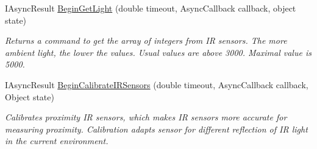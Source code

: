 \begin{DoxyCompactItemize}
  \item   IAsyncResult \hyperlink{class_elib_1_1_epuck_afa1833fd4dfb949fec35efa8ec774cf9}{BeginGetLight} (double timeout, AsyncCallback callback, object state)
  \begin{DoxyCompactList}\small\item\em Returns a command to get the array of integers from IR sensors. The more ambient light, the lower the values. Usual values are above 3000. Maximal value is 5000. \item\end{DoxyCompactList}

  \item IAsyncResult \hyperlink{class_elib_1_1_epuck_a760541d00f318ee59be9fb1c83a0f8cd}{BeginCalibrateIRSensors} (double timeout, AsyncCallback callback, Object state)
  \begin{DoxyCompactList}\small\item\em Calibrates proximity IR sensors, which makes IR sensors more accurate for measuring proximity. Calibration adapts sensor for different reflection of IR light in the current environment. \item\end{DoxyCompactList}

  \end{DoxyCompactItemize}

